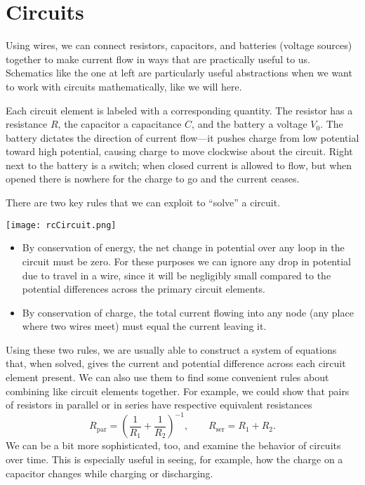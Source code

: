\documentclass[../p051main.tex]{subfiles}
\begin{document}
\section{Circuits}
\parbox{0.65\textwidth}{
    Using wires, we can connect resistors, capacitors, and batteries (voltage sources) together to make current flow in ways that are practically useful to us.
    Schematics like the one at left are particularly useful abstractions when we want to work with circuits mathematically, like we will here.

    \vspace{6pt}
    Each circuit element is labeled with a corresponding quantity.
    The resistor has a resistance $R$, the capacitor a capacitance $C$, and the battery a voltage $V_0$.
    The battery dictates the direction of current flow---it pushes charge from low potential toward high potential, causing charge to move clockwise about the circuit.
    Right next to the battery is a switch; when closed current is allowed to flow, but when opened there is nowhere for the charge to go and the current ceases.

    \vspace{6pt}
    There are two key rules that we can exploit to ``solve'' a circuit.
}\parbox{0.35\textwidth}{
    \quad\;
    \texttt{[image: rcCircuit.png]}
}
\begin{itemize}
    \item By conservation of energy, the net change in potential over any loop in the circuit must be zero.
    For these purposes we can ignore any drop in potential due to travel in a wire, since it will be negligibly small compared to the potential differences across the primary circuit elements.

    \item By conservation of charge, the total current flowing into any node (any place where two wires meet) must equal the current leaving it.
\end{itemize}
Using these two rules, we are usually able to construct a system of equations that, when solved, gives the current and potential difference across each circuit element present.
We can also use them to find some convenient rules about combining like circuit elements together.
For example, we could show that pairs of resistors in parallel or in series have respective equivalent resistances
\[ R_\textrm{par} = \left( \frac{1}{R_1} + \frac{1}{R_2} \right)^{-1}, \qquad R_\textrm{ser} = R_1 + R_2. \]
We can be a bit more sophisticated, too, and examine the behavior of circuits over time.
This is especially useful in seeing, for example, how the charge on a capacitor changes while charging or discharging.
\end{document}
